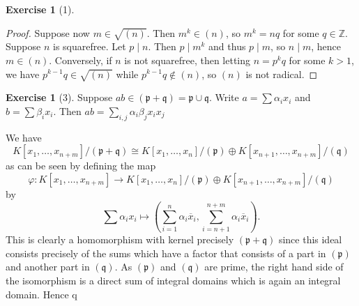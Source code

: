 \documentclass[reqno]{amsart}
\theoremstyle{definition}
\newtheorem{exercise}[theorem]{Exercise}
\theoremstyle{remark}
\begin{document}
\begin{exercise}[1]
\begin{proof}
             Suppose now
             $m \in \sqrt{\left( n \right) } $.
             Then $m^{k} \in \left( n \right) $, so
             $m^{k} = nq$ for some $q \in \mathbb{Z}$.
             Suppose $n$ is squarefree. Let
             $p  \mid n$. Then $p  \mid m^{k}$ and thus
             $p  \mid m$, so $n  \mid m$, hence
             $m \in \left( n \right) $. Conversely,
             if $n$ is not squarefree, then
             letting $n = p^k q$ for some $k>1$, we have
             $p^{k-1}q \in \sqrt{\left( n \right) } $ while
             $p^{k-1} q \not\in \left( n \right) $, so
             $\left( n \right) $ is not radical.
        \end{proof}
    \end{exercise}





    \begin{exercise}[3]
        Suppose
        $ab \in \left( \mathfrak{p}+\mathfrak{q} \right) =
        \mathfrak{p} \cup  \mathfrak{q}$. 
        Write 
        $a = \sum \alpha_i x_i$ and
        $b = \sum \beta_i x_i$.
        Then
        $ab = \sum_{i,j} \alpha_i \beta_j x_i x_j$ 

        We have
        \[
        K\left[ x_1,\ldots,x_{n+m} \right]/ 
        \left( \mathfrak{p}+ \mathfrak{q} \right) 
        \cong
        K\left[ x_1, \ldots, x_n \right] / \left( \mathfrak{p}
        \right) \oplus K\left[ x_{n+1},\ldots,x_{n+m} \right] 
        / \left( \mathfrak{q} \right) 
        \] 
        as can be seen
        by defining the map
        \[
        \varphi \colon
        K\left[ x_1,\ldots,x_{n+m} \right] 
        \to K\left[ x_1,\ldots,x_n \right] 
        / \left( \mathfrak{p} \right) 
        \oplus K\left[ x_{n+1},\ldots,x_{n+m} \right] 
        / \left( \mathfrak{q} \right) 
    \]
    by
    \[
    \sum \alpha_i x_i \mapsto 
    \left( \sum_{i=1}^{n} \alpha_i \overline{x}_i,
    \sum_{i=n+1}^{n+m} \alpha_i \overline{x}_i \right).
    \] 
    This is clearly a homomorphism with kernel
    precisely  $\left( \mathfrak{p} + \mathfrak{q} \right) $
    since this ideal consists precisely of
    the sums which have a factor that
    consists of a part in
    $\left( \mathfrak{p} \right) $ and
    another part in $\left( \mathfrak{q} \right) $.
    As $\left( \mathfrak{p} \right) $ and
    $\left( \mathfrak{q} \right) $ are prime,
    the right hand side of the isomorphism
    is a direct sum of integral domains which is
    again an integral domain. Hence
    q
    \end{exercise}






\end{document}
